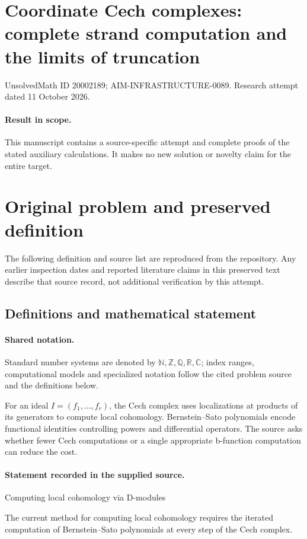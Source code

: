 \documentclass[11pt]{article}
\begin{document}
\section*{Coordinate Cech complexes: complete strand computation and the limits of truncation}
\noindent UnsolvedMath ID 20002189; AIM-INFRASTRUCTURE-0089. Research attempt dated 11 October 2026.
\paragraph{Result in scope.}This manuscript contains a source-specific attempt and complete proofs of the stated auxiliary calculations. It makes no new solution or novelty claim for the entire target.
\section{Original problem and preserved definition}
The following definition and source list are reproduced from the repository. Any earlier inspection dates and reported literature claims in this preserved text describe that source record, not additional verification by this attempt.
\subsection{Definitions and mathematical statement}

\paragraph{Shared notation.}Standard number systems are denoted by $\mathbb N,\mathbb Z,\mathbb Q,\mathbb R,\mathbb C$; index ranges, computational models and specialized notation follow the cited problem source and the definitions below.


For an ideal $I=(f_1,\ldots,f_r)$, the Cech complex uses localizations at products of its generators to compute local cohomology. Bernstein--Sato polynomials encode functional identities controlling powers and differential operators. The source asks whether fewer Cech computations or a single appropriate b-function computation can reduce the cost.
\paragraph{Statement recorded in the supplied source.}
Computing local cohomology via D-modules

The current method for computing local cohomology requires the iterated computation of Bernstein--Sato polynomials at every step of the Cech complex.
\end{document}
